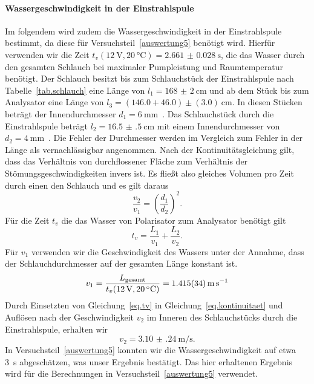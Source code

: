 \documentclass[paper=a4,
	fontsize=10pt,
	DIV=18,
	twocolumn,
	parskip=half
	]{scrartcl}
\numberwithin{equation}{section}    %
\begin{document}
\paragraph*{Wassergeschwindigkeit in der Einstrahlspule}
\label{wg}
Im folgendem wird zudem die Wassergeschwindigkeit in der Einstrahlspule bestimmt, da diese für Versuchsteil~\ref{auswertung5} benötigt wird.
Hierfür verwenden wir die Zeit $t_{v}(\SI{12}{\volt},\SI{20}{\celsius})= \SI{2.661(28)}{\second}$, die das Wasser durch den gesamten Schlauch bei maximaler Pumpleistung und Raumtemperatur benötigt. 
Der Schlauch besitzt bis zum Schlauchstück der Einstrahlspule nach Tabelle~\ref{tab.schlauch} eine Länge von $l_1 = \SI{168(2)}{\centi\meter}$ und ab dem Stück bis zum Analysator eine Länge von $l_3 = (146.0+46.0)\pm(3.0)\SI{}{\centi\meter}$. In diesen Stücken beträgt der Innendurchmesser $d_1 = \SI{6}{\milli\meter}$~\citep{anleitung}. Das Schlauchstück durch die Einstrahlspule beträgt $l_2 = \SI{16.5(5)}{\centi\meter}$ mit einem Innendurchmesser von $d_2 = \SI{4}{\milli\meter}$~\citep{anleitung}. Die Fehler der Durchmesser werden im Vergleich zum Fehler in der Länge als vernachlässigbar angenommen. 
Nach der Kontinuitätsgleichung gilt, dass das Verhältnis von durchflossener Fläche zum Verhältnis der Stömungsgeschwindigkeiten invers ist. Es fließt also gleiches Volumen pro Zeit durch einen den Schlauch und es gilt daraus
\begin{equation}
	\frac{v_2}{v_1} = \left(\frac{d_1}{d_2}\right)^2.
	\label{eq.kontinuitaet}
\end{equation}
Für die Zeit $t_v$ die das Wasser von Polarisator zum Analysator benötigt gilt
\begin{equation}
	t_v = \frac{L_1}{v_1} + \frac{L_2}{v_2}.
	\label{eq.tv}
\end{equation}
Für $v_1$ verwenden wir die Geschwindigkeit des Wassers unter der Annahme, dass der Schlauchdurchmesser auf der gesamten Länge konstant ist.
\begin{equation}
	v_1 = \frac{L_{\rm gesamt}}{t_{v}(\SI{12}{\volt},\SI{20}{\celsius})} = \SI{1.415(34)}{\meter\per\second}
\end{equation}
Durch Einsetzten von Gleichung~\eqref{eq.tv} in Gleichung~\eqref{eq.kontinuitaet} und Auflösen nach der Geschwindigkeit $v_2$ im Inneren des Schlauchstücks durch die Einstrahlspule, erhalten wir
\begin{equation}
	v_2 = \SI{3.10(24)}{\meter\per\second}. %
\end{equation}
In Versuchsteil~\ref{auswertung5} konnten wir die Wassergeschwindigkeit auf etwa \SI{3}{\second} abgeschätzen, was unser Ergebnis bestätigt. Das hier erhaltenen Ergebnis wird für die Berechnungen in Versuchsteil~\ref{auswertung5} verwendet.
\end{document}
